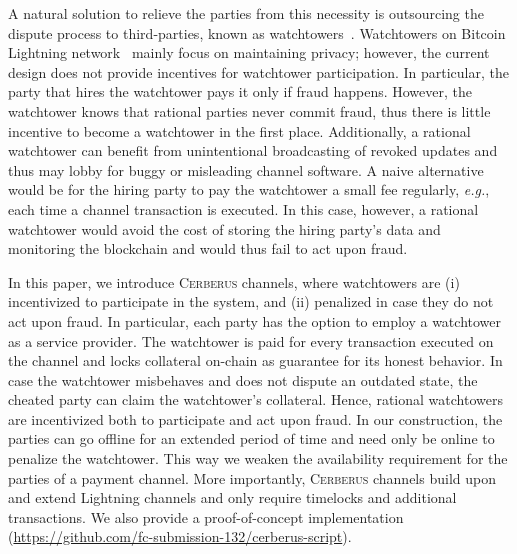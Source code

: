 \documentclass[runningheads]{llncs}
\newcommand{\eg}{{\em e.g.}}
\newcommand{\sys}{\textsc{Cerberus}\xspace}
\begin{document}
A natural solution to relieve the parties from this necessity is outsourcing the dispute process to third-parties, known as watchtowers~\cite{watchtowers,dryja2016monitors}.
Watchtowers on Bitcoin Lightning network~\cite{poon2015lightning} mainly focus on maintaining privacy; however, the current design does not provide incentives for watchtower participation.
In particular, the party that hires the watchtower pays it only if fraud happens. However, the watchtower knows that rational parties never commit fraud, thus there is little incentive to become a watchtower in the first place. Additionally, a rational watchtower can benefit from unintentional broadcasting of revoked updates and thus may lobby for buggy or misleading channel software. A naive alternative would be for the hiring party to pay the watchtower a small fee regularly, \eg, each time a channel transaction is executed. In this case, however, a rational watchtower would avoid the cost of storing the hiring party's data and monitoring the blockchain and would thus fail to act upon fraud.

In this paper, we introduce \sys channels, where watchtowers are (i) incentivized to participate in the system, and (ii) penalized in case they do not act upon fraud.
In particular,
each party has the option to employ a watchtower as a service provider. The watchtower  is paid for every transaction executed on the channel and locks collateral on-chain as guarantee for its honest behavior. In case the watchtower misbehaves and does not dispute an outdated state, the cheated party can claim the watchtower's collateral.
Hence, rational watchtowers are incentivized both to participate and act upon fraud.
In our construction, the parties can go offline for an extended period of time and need only be online to penalize the watchtower.
This way we weaken the availability requirement for the parties of a payment channel.
More importantly, \sys channels build upon and extend Lightning channels and only require timelocks and additional transactions.%
We also provide a proof-of-concept implementation (\url{https://github.com/fc-submission-132/cerberus-script}).
\end{document}
